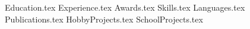 \documentclass[11pt, a4paper]{awesome-cv}
\newcommand*{\sectiondir}{resume/}
\begin{document}
\makecvheader
\hspace{14.17 cm}


{Education.tex}
\vspace{0.05 cm}
{Experience.tex}
\vspace{0.05 cm}
\newpage
{Awards.tex}
\vspace{-0.1 cm}
{Skills.tex}
\vspace{-0.1 cm}
{Languages.tex}
\vspace{0.05 cm}
{Publications.tex}
\vspace{-0.2 cm}
{HobbyProjects.tex}
\vspace{-0.2 cm}
{SchoolProjects.tex}
\vspace{-0.2 cm}
\end{document}
